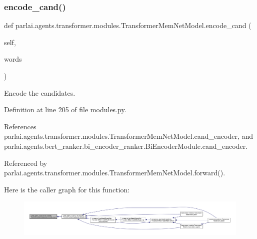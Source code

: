 \subsubsection{\texorpdfstring{encode\+\_\+cand()}{encode\_cand()}}
{\footnotesize\ttfamily def parlai.\+agents.\+transformer.\+modules.\+Transformer\+Mem\+Net\+Model.\+encode\+\_\+cand (\begin{DoxyParamCaption}\item[{}]{self,  }\item[{}]{words }\end{DoxyParamCaption})}

\begin{DoxyVerb}Encode the candidates.\end{DoxyVerb}
 

Definition at line 205 of file modules.\+py.



References parlai.\+agents.\+transformer.\+modules.\+Transformer\+Mem\+Net\+Model.\+cand\+\_\+encoder, and parlai.\+agents.\+bert\+\_\+ranker.\+bi\+\_\+encoder\+\_\+ranker.\+Bi\+Encoder\+Module.\+cand\+\_\+encoder.



Referenced by parlai.\+agents.\+transformer.\+modules.\+Transformer\+Mem\+Net\+Model.\+forward().

Here is the caller graph for this function\+:
\nopagebreak
\begin{figure}[H]
\begin{center}
\leavevmode
\includegraphics[width=350pt]{classparlai_1_1agents_1_1transformer_1_1modules_1_1TransformerMemNetModel_a1e39cdf6357c9e8dd9f90e7f351e42a1_icgraph}
\end{center}
\end{figure}
\mbox{\label{classparlai_1_1agents_1_1transformer_1_1modules_1_1TransformerMemNetModel_a12c6c4a26be5401e61c43ec4aa886812}} 
